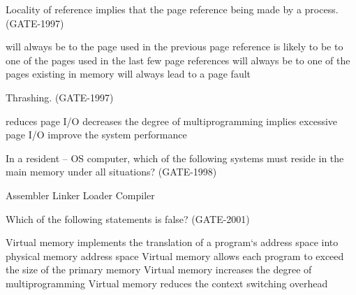 \begin{questyle}

  \question Locality of reference implies that the page reference being made by a process. (GATE-1997)

  \begin{choices}
    \choice will always be to the page used in the previous page reference
    \choice is likely to be to one of the pages used in the last few page references
    \choice will always be to one of the pages existing in memory
    \choice will always lead to a page fault
  \end{choices}
\end{questyle}


\begin{questyle}

  \question Thrashing. (GATE-1997)

  \begin{choices}
    \choice reduces page I/O
    \choice decreases the degree of multiprogramming
    \choice implies excessive page I/O
    \choice improve the system performance
  \end{choices}
\end{questyle}


\begin{questyle}

  \question In a resident – OS computer, which of the following systems must reside in the main memory under all situations?  (GATE-1998)

  \begin{oneparchoices}
    \choice Assembler
    \choice Linker
    \choice Loader
    \choice Compiler
  \end{oneparchoices}

\end{questyle}



\begin{questyle}

  \question  Which of the following statements is false? (GATE-2001)

  \begin{choices}
    \choice Virtual memory implements the translation of a program‘s address space into physical memory address space
    \choice Virtual memory allows each program to exceed the size of the primary memory
    \choice Virtual memory increases the degree of multiprogramming
    \choice Virtual memory reduces the context switching overhead
  \end{choices}

\end{questyle}

